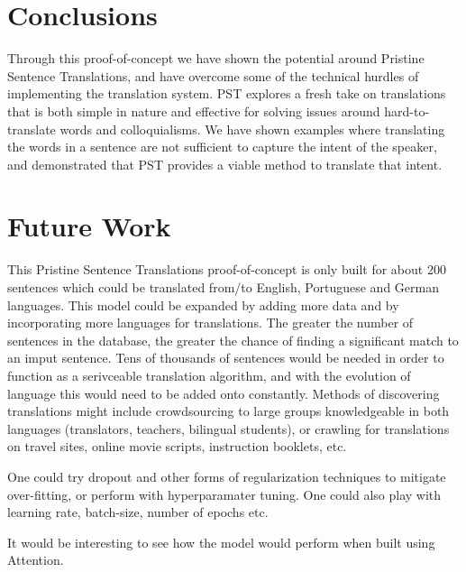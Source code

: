 \documentclass[runningheads]{llncs}
\begin{document}
	
	\section{Conclusions}
	Through this proof-of-concept we have shown the potential around Pristine Sentence Translations, and have overcome some of the technical hurdles of implementing the translation system. PST explores a fresh take on translations that is both simple in nature and effective for solving issues around hard-to-translate words and colloquialisms. We have shown examples where translating the words in a sentence are not sufficient to capture the intent of the speaker, and demonstrated that PST provides a viable method to translate that intent. 

	\section{Future Work}
	This Pristine Sentence Translations proof-of-concept is only built for about 200 sentences which could be translated from/to English, Portuguese and German languages. This model could be expanded by adding more data and by incorporating more languages for translations. The greater the number of sentences in the database, the greater the chance of finding a significant match to an imput sentence. Tens of thousands of sentences would be needed in order to function as a serivceable translation algorithm, and with the evolution of language this would need to be added onto constantly. Methods of discovering translations might include crowdsourcing to large groups knowledgeable in both languages (translators, teachers, bilingual students), or crawling for translations on travel sites, online movie scripts, instruction booklets, etc.
	
	One could try dropout and other forms of regularization techniques to mitigate over-fitting, or perform with hyperparamater tuning. One could also play with learning rate, batch-size, number of epochs etc.
	
	It would be interesting to see how the model would perform when built using Attention.
	
\end{document}
